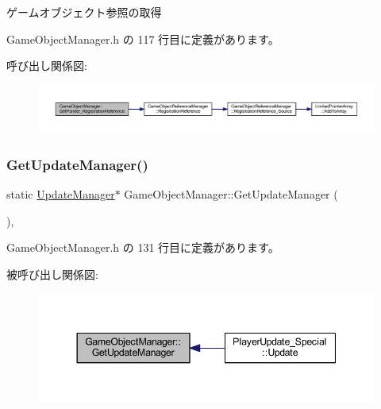 ゲームオブジェクト参照の取得 



 Game\+Object\+Manager.\+h の 117 行目に定義があります。

呼び出し関係図\+:\nopagebreak
\begin{figure}[H]
\begin{center}
\leavevmode
\includegraphics[width=350pt]{class_game_object_manager_a4b905d160c31b234686a3d46c0743adb_cgraph}
\end{center}
\end{figure}
\mbox{\label{class_game_object_manager_a7d34b53f99cc2264ab6a8c253392a865}} 
\subsubsection{\texorpdfstring{Get\+Update\+Manager()}{GetUpdateManager()}}
{\footnotesize\ttfamily static \mbox{\hyperlink{class_update_manager}{Update\+Manager}}$\ast$ Game\+Object\+Manager\+::\+Get\+Update\+Manager (\begin{DoxyParamCaption}{ }\end{DoxyParamCaption})\hspace{0.3cm}{\ttfamily [inline]}, {\ttfamily [static]}}



 Game\+Object\+Manager.\+h の 131 行目に定義があります。

被呼び出し関係図\+:\nopagebreak
\begin{figure}[H]
\begin{center}
\leavevmode
\includegraphics[width=344pt]{class_game_object_manager_a7d34b53f99cc2264ab6a8c253392a865_icgraph}
\end{center}
\end{figure}
\mbox{\label{class_game_object_manager_abda84aa3b4c79090c43243f93b5a9c46}} 
